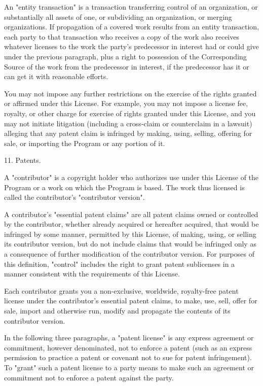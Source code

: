 \documentclass[parskip=half]{scrartcl}
\begin{document}
  An "entity transaction" is a transaction transferring control of an
organization, or substantially all assets of one, or subdividing an
organization, or merging organizations.  If propagation of a covered
work results from an entity transaction, each party to that
transaction who receives a copy of the work also receives whatever
licenses to the work the party's predecessor in interest had or could
give under the previous paragraph, plus a right to possession of the
Corresponding Source of the work from the predecessor in interest, if
the predecessor has it or can get it with reasonable efforts.

  You may not impose any further restrictions on the exercise of the
rights granted or affirmed under this License.  For example, you may
not impose a license fee, royalty, or other charge for exercise of
rights granted under this License, and you may not initiate litigation
(including a cross-claim or counterclaim in a lawsuit) alleging that
any patent claim is infringed by making, using, selling, offering for
sale, or importing the Program or any portion of it.

  11. Patents.

  A "contributor" is a copyright holder who authorizes use under this
License of the Program or a work on which the Program is based.  The
work thus licensed is called the contributor's "contributor version".

  A contributor's "essential patent claims" are all patent claims
owned or controlled by the contributor, whether already acquired or
hereafter acquired, that would be infringed by some manner, permitted
by this License, of making, using, or selling its contributor version,
but do not include claims that would be infringed only as a
consequence of further modification of the contributor version.  For
purposes of this definition, "control" includes the right to grant
patent sublicenses in a manner consistent with the requirements of
this License.

  Each contributor grants you a non-exclusive, worldwide, royalty-free
patent license under the contributor's essential patent claims, to
make, use, sell, offer for sale, import and otherwise run, modify and
propagate the contents of its contributor version.

  In the following three paragraphs, a "patent license" is any express
agreement or commitment, however denominated, not to enforce a patent
(such as an express permission to practice a patent or covenant not to
sue for patent infringement).  To "grant" such a patent license to a
party means to make such an agreement or commitment not to enforce a
patent against the party.
\end{document}
